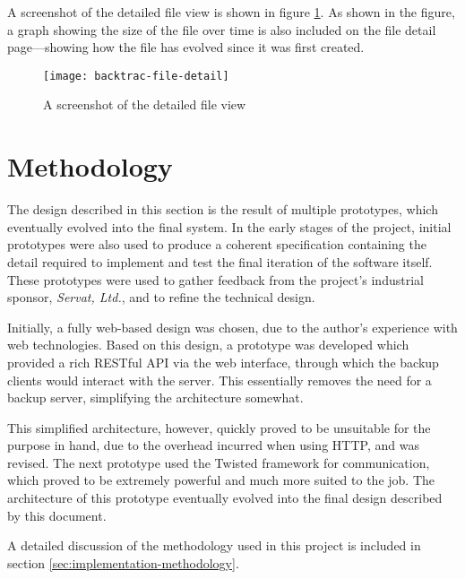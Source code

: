 A screenshot of the detailed file view is shown in figure
\ref{fig:backtrac-file-detail}. As shown in the figure, a graph showing the
size of the file over time is also included on the file detail page---showing
how the file has evolved since it was first created.

\begin{figure}
    \begin{center}
        \texttt{[image: backtrac-file-detail]}
    \end{center}
    \caption{A screenshot of the detailed file view}
    \label{fig:backtrac-file-detail}
\end{figure}

\section{Methodology}

The design described in this section is the result of multiple prototypes,
which eventually evolved into the final system. In the early stages of the
project, initial prototypes were also used to produce a coherent specification
containing the detail required to implement and test the final iteration of the
software itself. These prototypes were used to gather feedback from the
project's industrial sponsor, \emph{Servat, Ltd.}, and to refine the technical
design.

Initially, a fully web-based design was chosen, due to the author's experience
with web technologies. Based on this design, a prototype was developed which
provided a rich RESTful API via the web interface, through which the backup
clients would interact with the server. This essentially removes the need for
a backup server, simplifying the architecture somewhat.

This simplified architecture, however, quickly proved to be unsuitable for the
purpose in hand, due to the overhead incurred when using HTTP, and was revised.
The next prototype used the Twisted framework for communication, which proved
to be extremely powerful and much more suited to the job. The architecture of
this prototype eventually evolved into the final design described by this
document.

A detailed discussion of the methodology used in this project is included in
section \ref{sec:implementation-methodology}.

